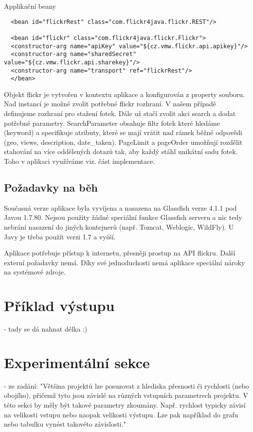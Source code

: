 \documentclass[12pt,oneside,a4paper]{article}
\begin{document}
Applikační beany
\begin{verbatim}
  <bean id="flickrRest" class="com.flickr4java.flickr.REST"/>
  
  <bean id="flickr" class="com.flickr4java.flickr.Flickr">
  <constructor-arg name="apiKey" value="${cz.vmw.flickr.api.apikey}"/>
  <constructor-arg name="sharedSecret" value="${cz.vmw.flickr.api.sharekey}"/>
  <constructor-arg name="transport" ref="flickrRest"/>
  </bean>
\end{verbatim}  
Objekt flickr je vytvořen v kontextu aplikace a konfigurován z property souboru. Nad instancí je možné zvolit potřebné flickr rozhraní. V našem případě definujeme rozhraní pro stažení fotek. Dále už stačí zvolit akci search a dodat potřebné parametry. SearchParameter obsahuje filtr fotek které hledáme (keyword) a specifikuje atributy, které se mají vrátit nad rámek běžné odpovědi (geo, views, description, date\_taken). PageLimit a pageOrder umožňují rozdělit stahování na více oddělených dotazů tak, aby každý stáhl unikátní sadu fotek. Toho v aplikaci využíváme viz. část implementace.
 

\subsection{Požadavky na běh}

Současná verze aplikace byla vyvíjena a nasazena na Glassfish verze 4.1.1 pod Javou 1.7.80. Nejsou použity žádné speciální funkce Glassfish serveru a nic tedy nebrání nasazení do jiných kontejnerů (např. Tomcat, Weblogic, WildFly). U Javy je třeba použít verzi 1.7 a vyšší.

Aplikace potřebuje přístup k internetu, přesněji prostup na API flickru. Další externí požadavky nemá. Díky své jednoduchosti nemá aplikace speciální nároky na systémové zdroje.


\section{Příklad výstupu}
- tady se dá nahnat délka :)

\section{Experimentální sekce}
- ze zadání: "Většina projektů lze posuzovat z hlediska přesnosti či rychlosti (nebo obojího),
přičemž tyto jsou závislé na různých vstupních parametrech projektu. V této sekci by
měly být takové parametry zkoumány. Např. rychlost typicky závisí na velikosti
vstupu nebo naopak velikosti výstupu. Lze pak například do grafu nebo tabulku
vynést takovéto závislosti."
\end{document}
